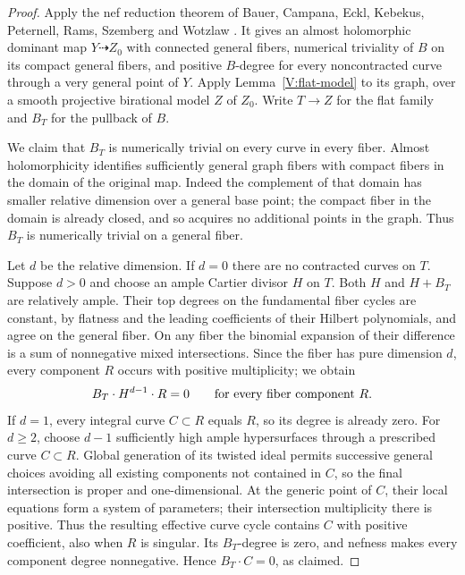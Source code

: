 \begin{proof}
Apply the nef reduction theorem of Bauer, Campana, Eckl, Kebekus,
Peternell, Rams, Szemberg and Wotzlaw
\cite[Theorem~2.1]{BCEKPRSW2002}.  It gives an almost holomorphic
dominant map $Y\dashrightarrow Z_0$ with connected general fibers,
numerical triviality of $B$ on its compact general fibers, and positive
$B$-degree for every noncontracted curve through a very general point
of $Y$.  Apply Lemma~\ref{V:flat-model} to its graph, over a smooth
projective birational model $Z$ of $Z_0$.  Write $T\to Z$ for the flat
family and $B_T$ for the pullback of $B$.

We claim that $B_T$ is numerically trivial on every curve in every fiber.
Almost holomorphicity identifies sufficiently general graph fibers with
compact fibers in the domain of the original map.  Indeed the complement
of that domain has smaller relative dimension over a general base point;
the compact fiber in the domain is already closed, and so acquires no
additional points in the graph.  Thus $B_T$ is numerically trivial on
a general fiber.

Let $d$ be the relative dimension.  If $d=0$ there are no contracted
curves on $T$.  Suppose $d>0$ and choose an ample Cartier divisor
$H$ on $T$.
Both $H$ and $H+B_T$ are relatively ample.  Their top degrees on the
fundamental fiber cycles are constant, by flatness and the leading
coefficients of their Hilbert polynomials, and agree on the general
fiber.  On any fiber the binomial expansion of their difference is a
sum of nonnegative mixed intersections.  Since the fiber has pure
dimension $d$, every component $R$ occurs with positive multiplicity;
we obtain
\[
 B_T\cdot H^{d-1}\cdot R=0
 \qquad\hbox{for every fiber component }R.
\]
If $d=1$, every integral curve $C\subset R$ equals $R$, so its degree
is already zero. For $d\ge2$, choose $d-1$ sufficiently high ample
hypersurfaces through a prescribed curve $C\subset R$. Global generation
of its twisted ideal permits successive general choices avoiding all
existing components not contained in $C$, so the final intersection is
proper and one-dimensional. At the generic point of $C$, their local
equations form a system of parameters; their intersection multiplicity
there is positive. Thus the resulting effective curve cycle contains
$C$ with positive coefficient, also when $R$ is singular.
Its $B_T$-degree is
zero, and nefness makes every component degree nonnegative.  Hence
$B_T\cdot C=0$, as claimed.


\end{proof}
